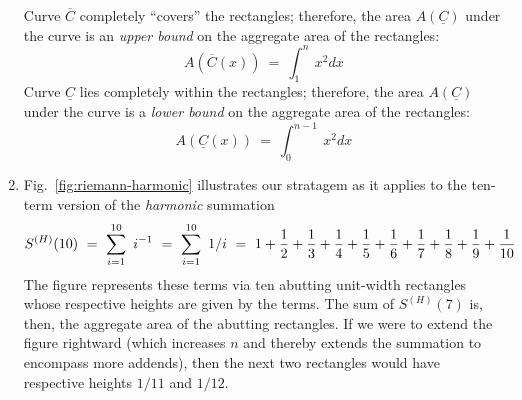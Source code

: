 \begin{enumerate}
\begin{figure}[htb]
\label{fig:riemann-n2}
\end{figure}
Curve $\overline{C}$ completely ``covers'' the rectangles; therefore, the area $A(\underline{C})$ under the curve is an {\em upper bound} on the aggregate area of the rectangles:
\[ A(\overline{C}(x)) \ = \ \int_1^n \ x^2 dx \]
Curve $\underline{C}$ lies completely within the rectangles; therefore, the area $A(\underline{C})$ under the curve is a {\em lower bound} on the aggregate area of the rectangles:
\[ A(\underline{C}(x)) \ = \  \int_0^{n-1}  \ x^2 dx \]

\item
Fig.~\ref{fig:riemann-harmonic} illustrates our stratagem as it applies to the ten-term version of the {\em harmonic} summation 
\[ S^{(H)}(10) \ = \ \sum_{i=1}^{10} \ i^{-1} \ = \ \sum_{i=1}^{10} \ 1/i 
  \ = \
1 +  {1 \over 2} + {1 \over 3}  + {1 \over 4}  + {1 \over 5} + {1 \over 6} + {1 \over 7} + {1 \over 8}  + {1 \over 9}  + {1 \over 10} 
\]
The figure represents these terms via ten abutting unit-width rectangles whose respective heights are given by the terms.  The sum of $S^{(H)}(7)$ is, then, the aggregate area of the abutting rectangles.  If we were to extend the figure rightward (which increases $n$ and thereby extends the summation to encompass more addends), then the next two rectangles would have respective heights $1/11$ and $1/12$.

\smallskip


\end{enumerate}

